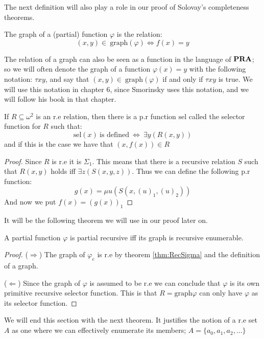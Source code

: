 \documentclass[../main.tex]{subfiles}
\begin{document}
The next definition will also play a role in our proof of Solovay's
completeness theorems.

\begin{defi}
	The graph of a (partial) function $\varphi$ is the relation:
	\[(x,y)\in\ \text{graph} (\varphi)\Leftrightarrow f(x)=y\]
\end{defi}
The relation of a graph can also be seen as a function in the language of
$\text{\textbf{PRA}}$; so we will often denote the graph of a function $\varphi(x)=y$ with the
following notation: $\tau xy$, and say that $(x,y)\in\ \text{graph}(\varphi)$ if and
only if $\tau xy$ is true. We will use this notation in chapter 6, since Smorinsky
uses this notation, and we will follow his book \citet{Smor1985} in that
chapter.

\begin{thm}
	If $R\subseteq\omega^2$ is an r.e relation, then there is a p.r
	function $\text{sel}$ called the selector function for $R$ such that:
	$$\text{sel}(x)\ \text{is defined}\ \Leftrightarrow\ \exists y(R(x,y))$$
	and if this is the case we have that $(x,f(x))\in R$
\end{thm}
\begin{proof}
	Since $R$ is r.e it is $\Sigma_1$. This means that there is a recursive
	relation $S$ such that $R(x,y)$ holds iff $\exists z (S(x,y,z))$. Thus
	we can define the following p.r function:
	$$g(x)=\mu u(S(x,(u)_1,(u)_2))$$
	And now we put $f(x)=(g(x))_1$
\end{proof}
It will be the following theorem we will use in our proof later on.
\begin{thm}
	A partial function $\varphi$ is partial recursive iff its graph is recursive
	enumerable.
\end{thm}
\begin{proof}
	($\Rightarrow$) The graph of $\varphi_e$ is r.e by theorem \ref{thm:RecSigma} and the
	definition of a graph.

	($\Leftarrow$) Since the graph of $\varphi$ is assumed to be r.e we can
	conclude that $\varphi$ is its own primitive recursive selector function. This
	is that $R=\text{graph} \varphi$ can only have $\varphi$ as its selector function.
\end{proof}

We will end this section with the next theorem. It justifies the notion of a
r.e set $A$ as one where we can effectively enumerate its members;
$A=\{a_0,a_1,a_2,\ldots\}$
\end{document}
